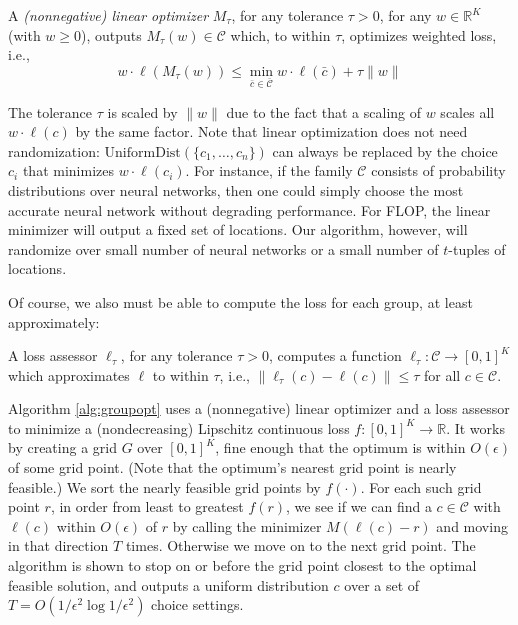 \documentclass[final, 12pt]{colt2018} %
\def\reals{{\mathbb R}}
\newcommand{\eps}{\epsilon}
\def\calC{\mathcal{C}}
\begin{document}
\begin{definition}
\label{def:LOO}
A {\em (nonnegative) linear optimizer} $M_\tau$, for any tolerance $\tau>0$, for any $w \in \reals^K$ (with $w \geq 0$), outputs $M_\tau(w)\in \calC$ which, to within $\tau$, optimizes weighted loss, i.e.,
$$w \cdot \ell(M_\tau(w)) \leq \min_{\bar{c} \in \bar{\calC}} w \cdot \ell(\bar{c}) + \tau \|w\|$$
\end{definition}
The tolerance $\tau$ is scaled by $\|w\|$ due to the fact that a scaling of $w$ scales all $w \cdot \ell(c)$ by the same factor. Note that linear optimization does not need randomization: $\mathrm{UniformDist}(\{c_1,\ldots,c_n\})$ can always be replaced by the choice $c_i$ that minimizes $w \cdot \ell(c_i)$. For instance, if the family $\calC$ consists of probability distributions over neural networks, then one could simply choose the most accurate neural network without degrading performance. For FLOP, the linear minimizer will output a fixed set of locations. Our algorithm, however, will randomize over small number of neural networks or a small number of $t$-tuples of locations.  

Of course, we also must be able to compute the loss for each group, at least approximately:
\begin{definition}
\label{def:GLO}
A loss assessor $\ell_\tau$, for any tolerance $\tau>0$, computes a function $\ell_\tau: \calC \rightarrow [0,1]^K$ which approximates $\ell$ to within $\tau$, i.e., $\|\ell_\tau(c)-\ell(c)\|\leq \tau$ for all $c \in \calC$.
\end{definition}

Algorithm \ref{alg:groupopt} uses a (nonnegative) linear optimizer and a loss assessor
to minimize a (nondecreasing) Lipschitz continuous loss $f: [0,1]^K\rightarrow \reals$.  It works by creating a grid $G$ over $[0,1]^K$, fine enough that the optimum is within $O(\eps)$ of some grid point. (Note that the optimum's nearest grid point is nearly feasible.) We sort the nearly feasible grid points by $f(\cdot)$. For each such grid point $r$, in order from least to greatest $f(r)$, we see if we can find a $c\in \calC$ with $\ell(c)$ within $O(\eps)$ of $r$ by calling the minimizer $M(\ell(c)-r)$ and moving in that direction $T$ times.  Otherwise we move on to the next grid point. The algorithm is shown to stop on or before the grid point closest to the optimal feasible solution, and outputs a uniform distribution $c$ over a set of $T=O(1/\eps^2 \log 1/\eps^2)$ choice settings.
\end{document}
